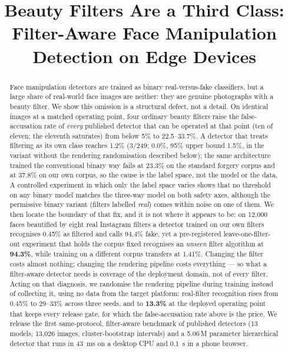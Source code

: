 \documentclass[conference]{IEEEtran}
\begin{document}
\title{Beauty Filters Are a Third Class:\\
Filter-Aware Face Manipulation Detection on Edge Devices}

\author{
}

\maketitle

\begin{abstract}
Face manipulation detectors are trained as binary real-versus-fake classifiers, but a large
share of real-world face images are neither: they are genuine photographs with a beauty filter.
We show this omission is a structural defect, not a detail. On identical images at a matched
operating point, four ordinary beauty filters raise the false-accusation rate of \emph{every}
published detector that can be operated at that point (ten of eleven; the eleventh saturates)
from below 5\% to 22.5--33.7\%. A detector that treats filtering as its own class reaches
1.2\% (3/249; 0.0\%, 95\% upper bound 1.5\%, in the variant without the rendering
randomisation described below); the same architecture trained the conventional binary
way fails at 23.3\% on the standard forgery corpus and at 37.8\% on our own corpus, so the
cause is the label space, not the model or the data. A controlled experiment in which only
the label space varies shows that no threshold on any binary model matches the three-way
model on both safety axes, although the permissive binary variant (filters labelled
\emph{real}) comes within noise on one of them. We then locate the boundary of that fix, and it is not
where it appears to be: on 12{,}000 faces beautified by eight real Instagram filters a detector
trained on our own filters recognises 0.45\% as filtered and calls 94.4\% fake, yet a pre-registered
leave-one-filter-out experiment that holds the corpus fixed recognises an \emph{unseen} filter
algorithm at \textbf{94.3\%}, while training on a different corpus transfers at 1.41\%.
Changing the filter costs almost nothing; changing the rendering pipeline costs everything ---
so what a filter-aware detector needs is coverage of the deployment domain, not of every
filter. Acting on that diagnosis, we randomise the rendering pipeline during training instead
of collecting it, using no data from the target platform: real-filter recognition rises from
0.45\% to 29--33\% across three seeds, and to \textbf{13.3\%} at the deployed operating point
that keeps every release gate, for which the false-accusation rate above is the price.
We release the first same-protocol, filter-aware benchmark of published detectors
(13 models, 13{,}026 images, cluster-bootstrap intervals) and a 5.06\,M parameter hierarchical
detector that runs in \SI{43}{\milli\second} on a desktop CPU and \SI{0.1}{\second} in a phone
browser.
\end{abstract}
\end{document}
